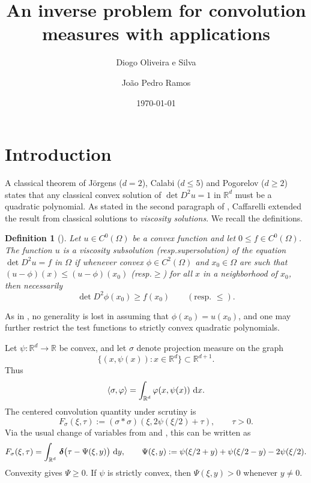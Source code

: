 \documentclass[11pt]{amsart}
\title{An inverse problem for convolution 
measures with applications}
\author{Diogo Oliveira e Silva}
\author{João Pedro Ramos}
\date{\today}
\newcommand{\pvector}[1]{
  \begin{pmatrix}
    #1
  \end{pmatrix}}
\newcommand{\ddirac}[1]{
  \,\boldsymbol{\delta}\!\pvector{#1}\!}
\renewcommand{\d}{\,{\rm d}}
\def\R{\mathbb{R}}
\newtheorem{definition}[theorem]{Definition}
\begin{document}
\begin{abstract}
\end{abstract}

\maketitle

\section{Introduction}

A classical theorem of Jörgens ($d=2$), Calabi ($d\leq 5$) and Pogorelov
($d\geq 2$) states that any classical convex solution of
$\det D^2u=1$ in $\R^d$ must be a quadratic polynomial.  As stated in the
second paragraph of \cite{CL03}, Caffarelli extended the result from
classical solutions to {\it viscosity solutions}.  We recall the definitions.
\begin{definition}[\cite{Gu16}]
    Let $u\in C^0(\Omega)$ be a convex function and let
    $0\leq f\in C^0(\Omega)$.  The function $u$ is a viscosity subsolution
    (resp.\@ supersolution) of the equation $\det D^2 u=f$ in $\Omega$ if
    whenever convex $\phi\in C^2(\Omega)$ and $x_0\in\Omega$ are such that
    $(u-\phi)(x)\leq (u-\phi)(x_0)$ (resp.\@ $\geq$) for all $x$ in a
    neighborhood of $x_0$, then necessarily
    \[
        \det D^2\phi(x_0)\geq f(x_0)
        \qquad(\text{resp. } \leq).
    \]
\end{definition}
\noindent As in \cite[Remark 1.3.3]{Gu16}, no generality is lost in assuming
that $\phi(x_0)=u(x_0)$, and one may further restrict the test functions to
strictly convex quadratic polynomials.

Let $\psi:\R^d\to\R$ be convex, and let $\sigma$ denote projection
measure on the graph
\[
    \{(x,\psi(x)):x\in\R^d\}\subset\R^{d+1}.
\]
Thus
\[
    \langle \sigma,\varphi\rangle
    =\int_{\R^d}\varphi(x,\psi(x))\,\d x.
\]
The centered convolution quantity under scrutiny is
\[
    F_\sigma(\xi,\tau)
    :=(\sigma\ast\sigma)(\xi,2\psi(\xi/2)+\tau),\qquad \tau>0.
\]
Via the usual change of variables from \cite[Prop. 2.1(c)]{OSQ18} and
\cite[Prop. 2.1(c)]{OSQ20}, this can be written as
\begin{equation}\label{eq:centered-conv}
    F_\sigma(\xi,\tau)
    =\int_{\R^d}
        \ddirac{\tau-\Psi(\xi,y)}
      \,\d y,
    \qquad
    \Psi(\xi,y):=\psi(\xi/2+y)+\psi(\xi/2-y)-2\psi(\xi/2).
\end{equation}
Convexity gives $\Psi\geq 0$.  If $\psi$ is strictly convex, then
$\Psi(\xi,y)>0$ whenever $y\neq 0$.
\end{document}
